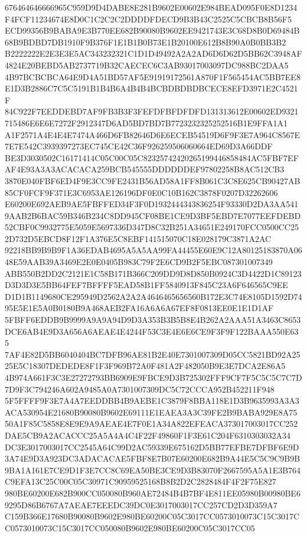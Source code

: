 \documentclass[UTF8,fontset=fandol,zihao=-4,a4paper]{ctexart}
\begin{document}
{{676464646666965C959D9D4DABE8E281B9602E00602E984BEAD095F0E8D1234F4FCF11234674E8D0C1C2C2C2DDDDFDECD9B3B43C2525C5CBCB8B56F5
ECD99356B9BABA9E3B770EE682B90080B9602EE9421743E3C68D8B0D69484B68B9BDBD7DB1910F9B376F1E1B1B0B73E1B20100E612B8B90A0B0BB3B2
B2222222E2E3E3E5AC343232321C1D1D49492A2A2AD6D6D62D5BB62C3948AF4824E20BEBD5AB2737719B32CAECEC6C3AB93017003097DC988BC2DAA5
4B97BCBCBCA64E9D4A51BD57AF5E91919172561A870F1F565454AC5BB7EE8E1D3B2886C7C5C5191B1B4B6A4B4B4BCBDBDBDBCECE8EFD3971E2C4521F
84C922F7EEDDEBD7AF9FB3B3F3FEFDFBFDFDFD131313612E00602ED9321715486E6E6E7272F2912347D6AD5BD7BD7B7723232325252516B1E9FFA1A1
A1F2571A4E4E4E7474A466D6FB82646D6E6ECEB54519D6F9F3E7A964C8567E7E7E542C3939397273EC745CE42C36F926259506060664ED69D3A66DDF
BE3D3030502C16171414C05C00C05C82325742420265199446858484AC5FBF7EFAF4E93A3A3ACACACA259BCB545555DDDDDDEF97802258B8AC512CB3
3870E040FBF6ED4F9E3CC9FE2431B56AD58A1FF8B061C3C8E625CB90427AB85CF0FCF9F371E3C6953AE126196DF0E0C10B162C3878F0207D32262606
E60200E692AEB9AE5FBFFED34F3F0D1932444343836254F93330D2DA3AA5419AAB2B6BAC59B346B234C8DD945CF08BE1CE9D3BF5EBD7E7077EEFDEBD
52CBF0C9932775E5059E5697336D347D8C32B251A34651E249170FCC0500CC252D732D5EBCD8F12F1A376E5C8EBF141515070C18E028179C3871A2AC
92218BB9B9B9F1A36EDAB4695A5A5AA99FA44455E60E9C12A80125183870A0648E59AAB39A3469E2E0E0405B983C79F2E6CD9B2F5EBC087301007349
ABB550B2DD2C2121E1C58B171B366C209DD9D8D850B0924C3D4422D1C89123D3D3D3E5BB64FEF7BFFFF5EAD58B1FF5840913F845C23A6F646565C9EE
D1D1B1149680CE295949D2562A2A2A4646465656560B172E3C74E8105D1592D7495E5E1E5A0B0180B9A468AEB2FA16A6A6A67EF8F0813EE0E1E1D1AF
5FBFF6EDDB9B9999A9A9A94D9D3A353B3B5B8E4B262A2AAA51A3463C8653DCE6AB4E9D3A656A6AEAE4E4244F53C3E4E6E6CE9F3F9F122BAAA550E635
7AF4E82D5BB6040404BC7DFB96AE81B2E40E7301007309D05CC5821BD92A2525E5C18307DEDEDE8F1F3F969B72A0F481A2F482050B9E3E7DCA2E86A5
4B974A661F3C3E27272793BB6909E9FBCE9D3B725302FFF9CF7F5C5C5C7C7D7D9F3C794246A602A9485A0A7301007309DC5C72CCCA952B452211F948
5F5FFFF9F3E7A4A7EEDDBB4B9AEBE1C3879F8BBA118E1D3B9635993A3A3ACA530954E21680B90080B9602E69111E1EAEA3A3C39FE2B9BABA929E8A75
50A1F85C5858E8E9E9A9AEAE4E7F0E1A34A822EFEACA373017003017CC252DAE5CB9A2ACACCC25A5A4A4C4F22F49860F1F3E61C204F6310303032A34
DC3E3017003017CC2545A64C99D2AC59339E675162D5BB77EFBE7DFBF6E9D3A74E9D3A923DC3ADACACAE5FBF8E7B07E60200E682B9A44E5C5C9C9B9B
9BA1A161E7CE9D1F3E7CC8C69EA50BE3CE9D3B83070F2667595A5A1E3B764C9EFA13C25C00C05C30971C90959525168B8B2D2C2828484F4F2F75E827
980BE60200E682B900CC050080B960AE72484B4B7BF4E811EE05980B00980BE69295D86B6767A7AEAE7EEEDC39DC0E3017003017CC257CD2D3D359A7
C159B366E17680B90080B9602E980BE60200C05C3017CC0573010073C15C3017CC0573010073C15C3017CC050080B9602E980BE60200C05C3017CC05
}}
\end{document}
